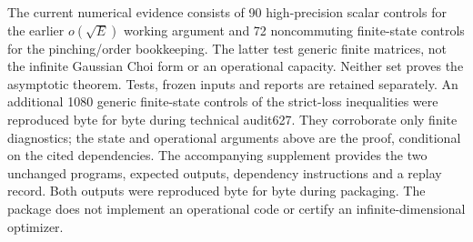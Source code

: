 \documentclass[11pt]{article}
\begin{document}
The current numerical evidence consists of 90 high-precision scalar
controls for the earlier \(o(\sqrt E)\) working argument and 72
noncommuting finite-state controls for the pinching/order bookkeeping.
The latter test generic finite matrices, not the infinite Gaussian Choi
form or an operational capacity. Neither set proves the asymptotic
theorem. Tests, frozen inputs and reports are retained separately.
An additional 1080 generic finite-state controls of the strict-loss
inequalities were reproduced byte for byte during technical audit627.
They corroborate only finite diagnostics; the state and operational
arguments above are the proof, conditional on the cited dependencies.
The accompanying supplement provides the two unchanged programs,
expected outputs, dependency instructions and a replay record.
Both outputs were reproduced byte for byte during packaging.
The package does not implement an operational code or certify an
infinite-dimensional optimizer.
\end{document}
